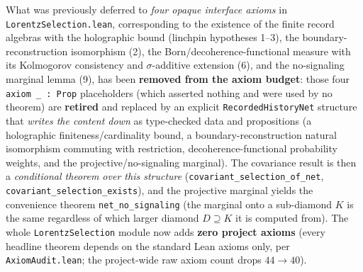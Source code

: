 \documentclass[11pt,a4paper]{article}
\begin{document}
What was previously deferred to \emph{four opaque interface axioms} in \texttt{LorentzSelection.lean}, corresponding to the existence of the finite record algebras with the holographic bound (linchpin hypotheses 1–3), the boundary-reconstruction isomorphism (2), the Born/decoherence-functional measure with its Kolmogorov consistency and $\sigma$-additive extension (6), and the no-signaling marginal lemma (9), has been \textbf{removed from the axiom budget}: those four \texttt{axiom \_ : Prop} placeholders (which asserted nothing and were used by no theorem) are \textbf{retired} and replaced by an explicit \texttt{RecordedHistoryNet} structure that \emph{writes the content down} as type-checked data and propositions (a holographic finiteness/cardinality bound, a boundary-reconstruction natural isomorphism commuting with restriction, decoherence-functional probability weights, and the projective/no-signaling marginal). The covariance result is then a \emph{conditional theorem over this structure} (\texttt{covariant\_selection\_of\_net}, \texttt{covariant\_selection\_exists}), and the projective marginal yields the convenience theorem \texttt{net\_no\_signaling} (the marginal onto a sub-diamond $K$ is the same regardless of which larger diamond $D\supseteq K$ it is computed from). The whole \texttt{LorentzSelection} module now adds \textbf{zero project axioms} (every headline theorem depends on the standard Lean axioms only, per \texttt{AxiomAudit.lean}; the project-wide raw axiom count drops $44\to 40$).
\end{document}
